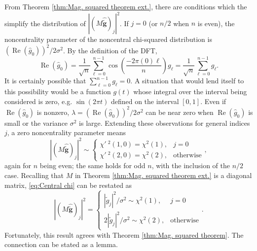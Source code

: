 \documentclass[12pt]{article}
\newcommand{\gnoiseVec}{\widetilde{\mathbf{g}}}	%
\newcommand{\noiseSD}{\sigma}	%
\renewcommand{\Re}{\operatorname{Re}}	%
\newcommand{\NCchi}{\chi'\:}	%
\begin{document}
From Theorem \ref{thm:Mag. squared theorem ext.}, there are conditions which the simplify the distribution of $|(M\widehat{\gnoiseVec})_j|^2$. If $j = 0$ (or $n/2$ when $n$ is even), the noncentrality parameter of the noncentral chi-squared distribution is $(\Re(\widehat{g}_0))^2/2\noiseSD^2$. By the definition of the DFT,
\[\Re(\widehat{g}_0) = \frac{1}{\sqrt{n}}\sum_{\ell=0}^{n-1} \cos\left(\frac{-2\pi(0)\ell}{n}\right)g_\ell = \frac{1}{\sqrt{n}}\sum_{\ell=0}^{n-1} g_\ell.\]
It is certainly possible that $\sum_{\ell=0}^{n-1} g_\ell = 0$. A situation that would lend itself to this possibility would be a function $g(t)$ whose integral over the interval being considered is zero, e.g. $\sin(2\pi{t})$ defined on the interval $[0,1]$. Even if $\Re(\widehat{g}_0)$ is nonzero, $\lambda = (\Re(\widehat{g}_0))^2/2\noiseSD^2$ can be near zero when $\Re(\widehat{g}_0)$ is small or the variance $\noiseSD^2$ is large. Extending these observations for general indices $j$, a zero noncentrality parameter means
\begin{equation}
\label{eq:Central chi}
|(M\widehat{\gnoiseVec})_j|^2 \sim \begin{cases}
\NCchi^2\left(1,0\right) = \chi^2(1), & j = 0 \\
\NCchi^2\left(2,0\right) = \chi^2(2), & \text{otherwise} \end{cases},
\end{equation}
again for $n$ being even; the same holds for odd $n$, with the inclusion of the $n/2$ case.  Recalling that $M$ in Theorem \ref{thm:Mag. squared theorem ext.} is a diagonal matrix, \eqref{eq:Central chi} can be restated as
\[|(M\widehat{\gnoiseVec})_j|^2 = \begin{cases}
|\widehat{\tilde{g}}_j|^2/\noiseSD^2 \sim \chi^2(1), & j = 0 \\
2|\widehat{\tilde{g}}_j|^2/\noiseSD^2 \sim \chi^2(2), & \text{otherwise} \end{cases}.\]
Fortunately, this result agrees with Theorem \ref{thm:Mag. squared theorem}. The connection can be stated as a lemma.
\end{document}
